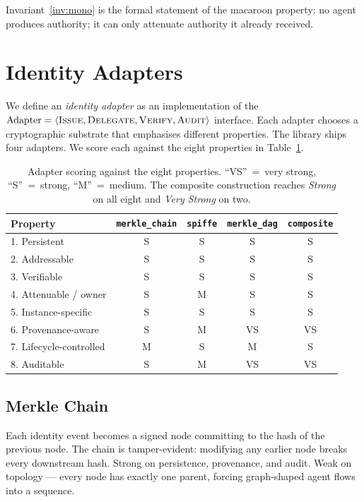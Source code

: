 \documentclass[11pt,a4paper]{article}
\begin{document}
Invariant~\ref{inv:mono} is the formal statement of the macaroon
property: no agent produces authority; it can only attenuate authority it
already received.

\section{Identity Adapters}\label{sec:adapters}

We define an \emph{identity adapter} as an implementation of the
$\mathrm{Adapter} = \langle \textsc{Issue}, \textsc{Delegate},
\textsc{Verify}, \textsc{Audit} \rangle$ interface. Each adapter chooses
a cryptographic substrate that emphasises different properties. The
library ships four adapters. We score each against the eight properties
in Table~\ref{tab:scores}.

\begin{table}[t]
\centering
\small
\caption{Adapter scoring against the eight properties. ``VS''~=~very strong, ``S''~=~strong, ``M''~=~medium. The composite construction reaches \emph{Strong} on all eight and \emph{Very Strong} on two.}\label{tab:scores}
\begin{tabular}{lcccc}
\toprule
Property & \texttt{merkle\_chain} & \texttt{spiffe} & \texttt{merkle\_dag} & \texttt{composite} \\
\midrule
1. Persistent           & S  & S  & S  & S  \\
2. Addressable          & S  & S  & S  & S  \\
3. Verifiable           & S  & S  & S  & S  \\
4. Attenuable / owner   & S  & M  & S  & S  \\
5. Instance-specific    & S  & S  & S  & S  \\
6. Provenance-aware     & S  & M  & VS & VS \\
7. Lifecycle-controlled & M  & S  & M  & S  \\
8. Auditable            & S  & M  & VS & VS \\
\bottomrule
\end{tabular}
\end{table}

\subsection{Merkle Chain}

Each identity event becomes a signed node committing to the hash of the
previous node. The chain is tamper-evident: modifying any earlier node
breaks every downstream hash. Strong on persistence, provenance, and
audit. Weak on topology --- every node has exactly one parent, forcing
graph-shaped agent flows into a sequence.
\end{document}
